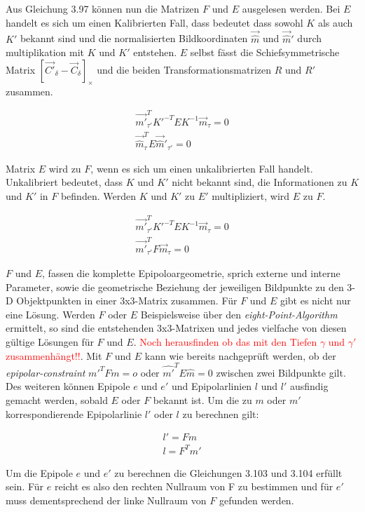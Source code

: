 Aus Gleichung 3.97 können nun die Matrizen $F$ und $E$ ausgelesen werden. Bei $E$ handelt es sich um einen Kalibrierten Fall, dass bedeutet dass sowohl $K$ als auch $K'$ bekannt sind und die normalisierten Bildkoordinaten $\vec{\hat{m}}$ und $\vec{\hat{m}}'$  durch multiplikation mit $K$ und $K'$ entstehen. $E$ selbst fässt die Schiefsymmetrische Matrix $[\vec{C'}_\delta - \vec{C}_\delta]_\times$ und die beiden Transformationsmatrizen $R$ und $R'$ zusammen. 

\begin{gather}
	\vec{m'}_{\tau'}^T K'^{-T}EK^{-1}\vec{m}_\tau = 0\\
	\vec{\hat{m}}_\tau^T E \vec{\hat{m}}'_{\tau'} = 0
\end{gather}

Matrix $E$ wird zu $F$, wenn es sich um einen unkalibrierten Fall handelt. Unkalibriert bedeutet, dass $K$ und $K'$ nicht bekannt sind, die Informationen zu $K$ und $K'$ in $F$ befinden. Werden $K$ und $K'$ zu $E'$ multipliziert, wird $E$ zu $F$. 

\begin{gather}
	\vec{m'}_{\tau'}^T K'^{-T}EK^{-1}\vec{m}_\tau = 0\\
		\vec{m'}_{\tau'}^T F\vec{m}_\tau = 0
\end{gather}

$F$ und $E$, fassen die komplette Epipoloargeometrie, sprich externe und interne Parameter, sowie die geometrische Beziehung der jeweiligen Bildpunkte zu den 3-D Objektpunkten in einer 3x3-Matrix zusammen. Für $F$ und $E$ gibt es nicht nur eine Lösung. Werden $F$ oder $E$ Beispielsweise über den \textit{eight-Point-Algorithm} ermittelt, so sind die entstehenden 3x3-Matrixen und jedes vielfache von diesen gültige Lösungen für $F$ und $E$\cite{HZ,HZ8}. \textcolor{red}{Noch herausfinden ob das mit den Tiefen $\gamma$ und $\gamma'$ zusammenhängt!!}. Mit $F$ und $E$ kann wie bereits nachgeprüft werden, ob der \textit{epipolar-constraint} $m'^TFm = o$ oder $\hat{m'}^TE\hat{m} = 0$ zwischen zwei Bildpunkte gilt. Des weiteren können Epipole $e$ und $e'$ und Epipolarlinien $l$ und $l'$ ausfindig gemacht werden, sobald $E$ oder $F$ bekannt ist\cite{HZ,Elements,HZ8,ZZGXr}. Um die zu $m$ oder $m'$ korrespondierende Epipolarlinie $l'$ oder $l$ zu berechnen gilt:

\begin{gather}
l' = Fm\\
l = F^Tm'
\end{gather} 

Um die Epipole $e$ und $e'$ zu berechnen die Gleichungen 3.103 und 3.104 erfüllt sein. Für $e$ reicht es also den rechten Nullraum von F zu bestimmen und für $e'$ muss dementsprechend der linke Nullraum von $F$ gefunden werden. 

